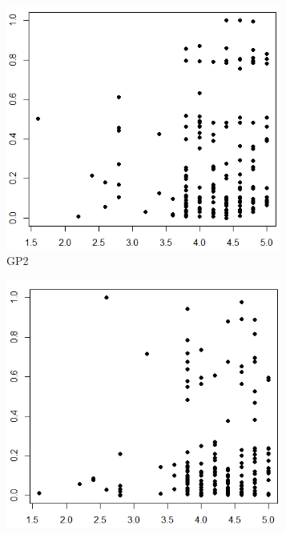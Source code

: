 \begin{figure}
\centering
\begin{subfigure}{.3\textwidth}
  \centering
	\includegraphics[width=0.99\textwidth]{figures/aggregation_plots_gp2.png}
	\caption{GP2}
\end{subfigure}%
\begin{subfigure}{.3\textwidth}
  \centering
	\includegraphics[width=0.99\textwidth]{figures/aggregation_plots_top5.png}

\end{subfigure}
\end{figure}
